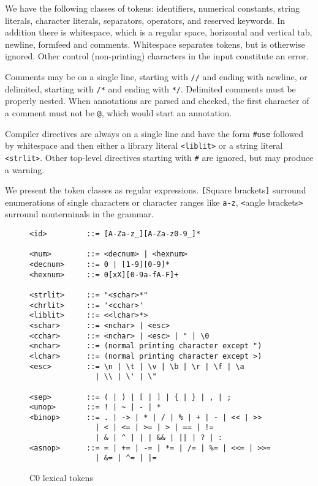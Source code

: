 \documentclass[11pt]{article}
\begin{document}
We have the following classes of tokens: identifiers, numerical
constants, string literals, character literals, separators, operators,
and reserved keywords.  In addition there is whitespace, which is
a regular space, horizontal and vertical tab, newline, formfeed
and comments.  Whitespace separates tokens, but is otherwise
ignored.  Other control (non-printing) characters in the input
constitute an error.

Comments may be on a single line, starting with \verb'//'
and ending with newline, or delimited, starting with
\verb'/*' and ending with \verb'*/'.  Delimited comments
must be properly nested.  When annotations are parsed and
checked, the first character of a comment must not be
\verb'@', which would start an annotation.

Compiler directives are always on a single line and have the form
\verb'#use' followed by whitespace and then either a library literal
\verb'<liblit>' or a string literal \verb'<strlit>'.  Other
top-level directives starting with \verb'#' are ignored, but
may produce a warning.

We present the token classes as regular expressions.  \verb'['Square
brackets\verb']' surround enumerations of single characters or
character ranges like \verb'a-z', \verb'<'angle brackets\verb'>'
surround nonterminals in the grammar.

\begin{figure}
\begin{small}
\begin{verbatim}
<id>         ::= [A-Za-z_][A-Za-z0-9_]*

<num>        ::= <decnum> | <hexnum>
<decnum>     ::= 0 | [1-9][0-9]*
<hexnum>     ::= 0[xX][0-9a-fA-F]+

<strlit>     ::= "<schar>*"
<chrlit>     ::= '<cchar>'
<liblit>     ::= <<lchar>*>
<schar>      ::= <nchar> | <esc>
<cchar>      ::= <nchar> | <esc> | " | \0
<nchar>      ::= (normal printing character except ")
<lchar>      ::= (normal printing character except >)
<esc>        ::= \n | \t | \v | \b | \r | \f | \a 
               | \\ | \' | \"

<sep>        ::= ( | ) | [ | ] | { | } | , | ;
<unop>       ::= ! | ~ | - | *
<binop>      ::= . | -> | * | / | % | + | - | << | >> 
               | < | <= | >= | > | == | !=
               | & | ^ | | | && | || | ? | :
<asnop>      ::= = | += | -= | *= | /= | %= | <<= | >>=
               | &= | ^= | |=
\end{verbatim}
\end{small}
\caption{C0 lexical tokens}
\label{fig:tokens}
\end{figure}
\end{document}
